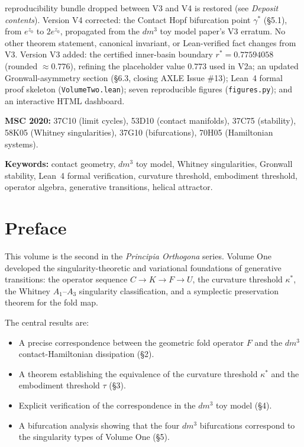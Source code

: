 \documentclass[11pt]{article}
\theoremstyle{boxed}
\begin{document}
reproducibility bundle dropped between V3 and V4 is restored (see \emph{Deposit contents}).
Version V4 corrected: the Contact Hopf bifurcation point $\gamma^{*}$ (\S 5.1),
from $e^{z_0}$ to $2e^{z_0}$, propagated from the $dm^3$ toy model paper's V3
erratum. No other theorem statement, canonical invariant, or Lean-verified
fact changes from V3. Version V3 added: the certified inner-basin boundary
$r^{*} = 0.77594058$ (rounded $\approx 0.776$), refining the placeholder value
$0.773$ used in V2a; an updated Gronwall-asymmetry section (\S 6.3, closing
AXLE Issue \#13); Lean~4 formal proof skeleton
(\texttt{VolumeTwo.lean}); seven reproducible figures (\texttt{figures.py});
and an interactive HTML dashboard.

\smallskip
\noindent\textbf{MSC 2020:} 37C10 (limit cycles), 53D10 (contact manifolds),
37C75 (stability), 58K05 (Whitney singularities), 37G10 (bifurcations), 70H05 (Hamiltonian systems).

\noindent\textbf{Keywords:} contact geometry, $dm^3$ toy model, Whitney
singularities, Gronwall stability, Lean~4 formal verification, curvature
threshold, embodiment threshold, operator algebra, generative transitions,
helical attractor.

\section*{Preface}

This volume is the second in the \emph{Principia Orthogona} series. Volume One
\cite{VolI} developed the singularity-theoretic and variational foundations of
generative transitions: the operator sequence $C \to K \to F \to U$, the
curvature threshold $\kappa^{*}$, the Whitney $A_1$--$A_3$ singularity
classification, and a symplectic preservation theorem for the fold map.

The central results are:
\begin{itemize}[leftmargin=2em]
  \item A precise correspondence between the geometric fold operator $F$ and the $dm^3$ contact-Hamiltonian dissipation (\S 2).
  \item A theorem establishing the equivalence of the curvature threshold $\kappa^{*}$ and the embodiment threshold $\tau$ (\S 3).
  \item Explicit verification of the correspondence in the $dm^3$ toy model (\S 4).
  \item A bifurcation analysis showing that the four $dm^3$ bifurcations correspond to the singularity types of Volume One (\S 5).
\end{itemize}
\end{document}
